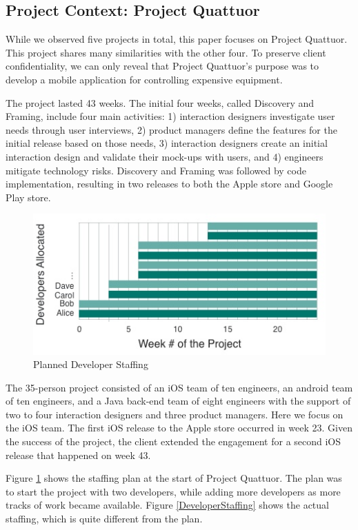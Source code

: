 \subsection{Project Context: Project Quattuor}
\label{ProjectQuattuor}
While we observed five projects in total, this paper focuses on Project Quattuor. This project shares many similarities with the other four. To preserve client confidentiality, we can only reveal that Project Quattuor's purpose was to develop a mobile application for controlling expensive equipment.

The project lasted 43 weeks. The initial four weeks, called Discovery and Framing, include four main activities: 1) interaction designers investigate user needs through user interviews, 2) product managers define the features for the initial release based on those needs, 3) interaction designers create an initial interaction design and validate their mock-ups with users, and 4) engineers mitigate technology risks. Discovery and Framing was followed by code implementation, resulting in two releases to both the Apple store and Google Play store.

\begin{figure}[t]
\centering
\includegraphics[width=\oneColumnWidth{}]{sustainable_software_development_images/OriginalDeveloperStaffingV3.jpg}
\caption{Planned Developer Staffing}
\label{PlannedDeveloperStaffing}
\end{figure}

The 35-person project consisted of an iOS team of ten engineers, an android team of ten engineers, and a Java back-end team of eight engineers with the support of two to four interaction designers and three product managers. Here we focus on the iOS team. The first iOS release to the Apple store occurred in week 23. Given the success of the project, the client extended the engagement for a second iOS release that happened on week 43. 

Figure \ref{PlannedDeveloperStaffing} shows the staffing plan at the start of Project Quattuor. The plan was to start the project with two developers, while adding more developers as more tracks of work became available. Figure \ref{DeveloperStaffing} shows the actual staffing, which is quite different from the plan.

